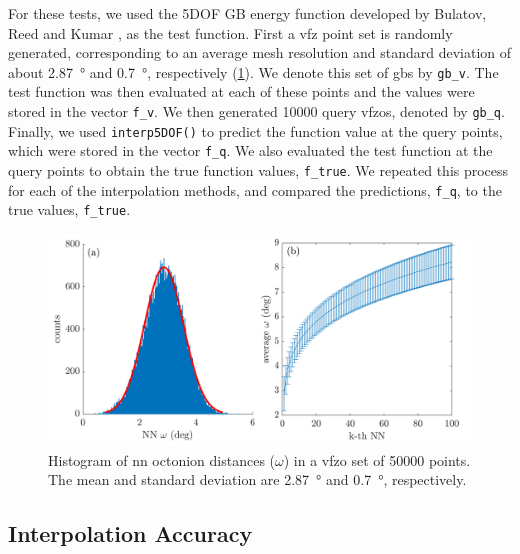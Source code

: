 \documentclass[preprint,12pt]{elsarticle}
\begin{document}
For these tests, we used the 5DOF GB energy function developed by Bulatov, Reed and Kumar \cite{bulatovGrainBoundaryEnergy2014}, as the test function. First a \gls{vfz} point set is randomly generated, corresponding to an average mesh resolution and standard deviation of about \SI{2.87}{\degree} and \SI{0.7}{\degree}, respectively (\cref{fig:nnhist-knn-50000}). We denote this set of \glspl{gb} by \texttt{gb\_v}. The test function was then evaluated at each of these points and the values were stored in the vector \texttt{f\_v}. We then generated \num{10000} query \glspl{vfzo}, denoted by \texttt{gb\_q}. Finally, we used \texttt{interp5DOF()} \cite{bairdFiveDegreeofFreedom5DOF2020} to predict the function value at the query points, which were stored in the vector \texttt{f\_q}. We also evaluated the test function at the query points to obtain the true function values, \texttt{f\_true}. We repeated this process for each of the interpolation methods, and compared the predictions, \texttt{f\_q}, to the true values, \texttt{f\_true}.
\begin{figure}
\centering
\includegraphics[scale=1]{nnhist-knn-50000.png}
\caption{Histogram of \gls{nn} octonion distances ($\omega$) in a \gls{vfzo} set of \num{50000} points. The mean and standard deviation are \SI{2.87}{\degree} and \SI{0.7}{\degree}, respectively.} %
\label{fig:nnhist-knn-50000}
\end{figure}

\subsection{Interpolation Accuracy}
\label{sec:results:accuracy}
\end{document}
